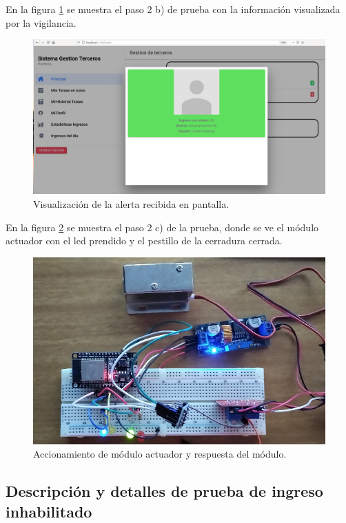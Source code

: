 En la figura \ref{fig:ingresoOk} se muestra el paso 2 b) de prueba con la información visualizada por la vigilancia.

\begin{figure}[h]
	\centering
	\includegraphics[width=1\textwidth]{./Figures/ingresoOk.png}
	\caption{Visualización de la alerta recibida en pantalla.}
	\label{fig:ingresoOk}
\end{figure}

En la figura \ref{fig:actuadorOK} se muestra el paso 2 c) de la prueba, donde se ve el módulo actuador con el led prendido y el pestillo de la cerradura cerrada.

\begin{figure}[h]
	\centering
	\includegraphics[width=1\textwidth]{./Figures/actuadorOK.png}
	\caption{Accionamiento de módulo actuador y respuesta del módulo.}
	\label{fig:actuadorOK}
\end{figure}

\clearpage
\subsection{Descripción y detalles de prueba de ingreso inhabilitado}

